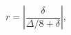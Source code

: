 \begin{equation}
r = \left| \frac{\delta}{\Delta/8 + \delta} \right|,
\label{eq:HL}
\end{equation}

